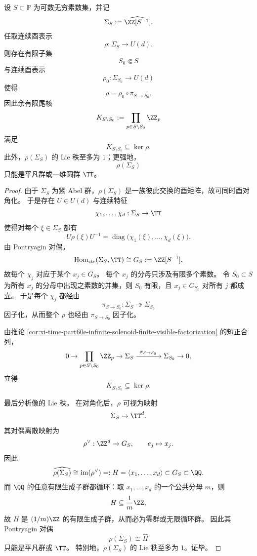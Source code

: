 \begin{theorem}\label{thm:xi-time-part60f2-finite-dimensional-representation-finite-prime-factorization}
设 \(S\subset\mathbb P\) 为可数无穷素数集，并记
\[
\Sigma_S:=\widehat{\ZZ[S^{-1}]}.
\]
任取连续酉表示
\[
\rho:\Sigma_S\to U(d).
\]
则存在有限子集
\[
S_0\Subset S
\]
与连续酉表示
\[
\rho_0:\Sigma_{S_0}\to U(d)
\]
使得
\[
\rho=\rho_0\circ \pi_{S\to S_0}.
\]
因此余有限尾核
\[
K_{S\setminus S_0}:=\prod_{p\in S\setminus S_0}\ZZ_p
\]
满足
\[
K_{S\setminus S_0}\subseteq \ker\rho.
\]
此外，\(\rho(\Sigma_S)\) 的 Lie 秩至多为 \(1\)；更强地，
\[
\rho(\Sigma_S)
\]
只能是平凡群或一维圆群 \(\TT\)。
\end{theorem}
\begin{proof}
由于 \(\Sigma_S\) 为紧 Abel 群，\(\rho(\Sigma_S)\) 是一族彼此交换的酉矩阵，故可同时酉对角化。
于是存在 \(U\in U(d)\) 与连续特征
\[
\chi_1,\dots,\chi_d:\Sigma_S\to \TT
\]
使得对每个 \(\xi\in\Sigma_S\) 都有
\[
U\rho(\xi)U^{-1}
=
\operatorname{diag}\bigl(\chi_1(\xi),\dots,\chi_d(\xi)\bigr).
\]
由 Pontryagin 对偶，
\[
\operatorname{Hom}_{\mathrm{cts}}(\Sigma_S,\TT)\cong G_S:=\ZZ[S^{-1}],
\]
故每个 \(\chi_j\) 对应于某个 \(x_j\in G_S\)。
每个 \(x_j\) 的分母只涉及有限多个素数。
令 \(S_0\subset S\) 为所有 \(x_j\) 的分母中出现之素数的并集，则 \(S_0\) 有限，且 \(x_j\in G_{S_0}\) 对所有 \(j\) 都成立。
于是每个 \(\chi_j\) 都经由
\[
\pi_{S\to S_0}:\Sigma_S\twoheadrightarrow \Sigma_{S_0}
\]
因子化，从而整个 \(\rho\) 也经由 \(\pi_{S\to S_0}\) 因子化。

由推论 \ref{cor:xi-time-part60e-infinite-solenoid-finite-visible-factorization} 的短正合列，
\[
0\to \prod_{p\in S\setminus S_0}\ZZ_p\to \Sigma_S\xrightarrow{\ \pi_{S\to S_0}\ }\Sigma_{S_0}\to 0,
\]
立得
\[
K_{S\setminus S_0}\subseteq \ker\rho.
\]

最后分析像的 Lie 秩。
在对角化后，\(\rho\) 可视为映射
\[
\Sigma_S\to \TT^d.
\]
其对偶离散映射为
\[
\rho^\vee:\ZZ^d\to G_S,
\qquad
e_j\mapsto x_j.
\]
因此
\[
\widehat{\rho(\Sigma_S)}\cong \operatorname{im}(\rho^\vee)=:H
=
\langle x_1,\dots,x_d\rangle\subset G_S\subset\QQ.
\]
而 \(\QQ\) 的任意有限生成子群都循环：取 \(x_1,\dots,x_d\) 的一个公共分母 \(m\)，则
\[
H\subseteq \frac1m\ZZ,
\]
故 \(H\) 是 \((1/m)\ZZ\) 的有限生成子群，从而必为零群或无限循环群。
因此其 Pontryagin 对偶
\[
\rho(\Sigma_S)\cong \widehat H
\]
只能是平凡群或 \(\TT\)。
特别地，\(\rho(\Sigma_S)\) 的 Lie 秩至多为 \(1\)。证毕。
\end{proof}

